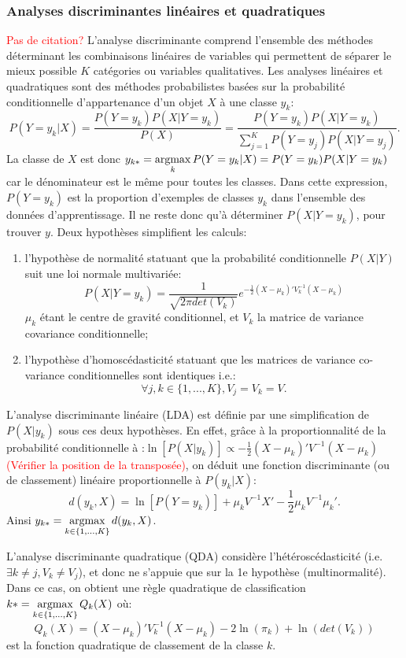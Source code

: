 \subsubsection{Analyses discriminantes linéaires et quadratiques}
\textcolor{red}{Pas de citation?}
L'analyse discriminante comprend l'ensemble des méthodes déterminant les combinaisons linéaires de variables qui permettent de séparer le mieux possible $K$ catégories ou variables qualitatives. Les analyses linéaires et quadratiques sont des méthodes probabilistes basées sur la probabilité conditionnelle d'appartenance d'un objet $X$ à une classe $y_k$: \[P(Y=y_k \vert X) = \frac{P(Y=y_k) P(X \vert Y=y_k)}{P(X)} = \frac{P(Y=y_k) P(X \vert Y=y_k)}{\sum\limits_{j = 1}^K P(Y=y_j) P(X \vert Y=y_j)}.\]
La classe de $X$ est donc $y_{k*} = \mathop{\mathrm{argmax}}\limits_k P(Y=y_k \vert X) = P(Y=y_k) P(X \vert Y=y_k)$ car le dénominateur est le même pour toutes les classes. Dans cette expression, $P(Y=y_k)$ est la proportion d'exemples de classes $y_k$ dans l'ensemble des données d'apprentissage. Il ne reste donc qu'à déterminer $P(X \vert Y=y_k)$, pour trouver $y$. Deux hypothèses simplifient les calculs:
\begin{enumerate}
	\item l'hypothèse de normalité statuant que la probabilité conditionnelle $P(X \vert Y)$ suit une loi normale multivariée: \[P(X \vert Y = y_k) = \frac{1}{\sqrt{2\pi det(V_k)}}e^{-\frac{1}{2}(X - \mu_k)'V_k^{-1}(X - \mu_k)} \] $\mu_k$ étant le centre de gravité conditionnel, et $V_k$ la matrice de variance covariance conditionnelle;
	\item l'hypothèse d'homoscédasticité statuant que les matrices de variance co-variance conditionnelles sont identiques i.e.: \[\forall j, k \in \lbrace 1,...,K \rbrace, V_j = V_k = V.\]
\end{enumerate}

L'analyse discriminante linéaire (LDA) est définie par une simplification de $P(X \vert y_k)$ sous ces deux hypothèses. En effet, grâce à la proportionnalité de la probabilité conditionnelle à :$\ln\left[P(X \vert y_k)\right] \propto -\frac{1}{2}( X - \mu_k )'V^{-1}(X - \mu_k )$\textcolor{red}{(Vérifier la position de la transposée)}, on déduit une fonction discriminante (ou de classement) linéaire proportionnelle à $P(y_k \vert X)$: \[d(y_k, X) = \ln\left[P(Y = y_k)\right] + \mu_k V^{-1}X' - \frac{1}{2}\mu_k V^{-1}\mu_k'.\] Ainsi $y_{k*} = \mathop{\mathrm{argmax}}\limits_{k \in \lbrace 1,...,K \rbrace} d(y_k, X)$.

L'analyse discriminante quadratique (QDA) considère l'hétéroscédasticité (i.e. $\exists k \neq j, V_k \neq V_j$), et donc ne s'appuie que sur la 1e hypothèse (multinormalité). Dans ce cas, on obtient une règle quadratique de classification $k* = \mathop{\mathrm{argmax}}\limits_{k \in \lbrace 1,...,K \rbrace} Q_k(X)$ où:
\[Q_k(X) = (X - \mu_k)' V_k^{-1}(X - \mu_k) - 2 \ln(\pi_k) + \ln(det(V_k))\] est la fonction quadratique de classement de la classe $k$.

